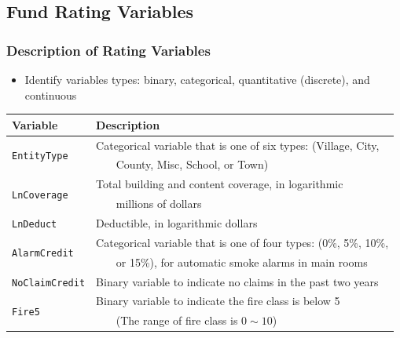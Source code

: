 \documentclass[serif,10pt]{beamer}
\begin{document}
\subsection{Fund Rating Variables}
\begin{frame}
\frametitle{Description of Rating Variables}
  \begin{itemize}
\item Identify variables types: binary, categorical, quantitative (discrete), and
continuous \vspace{2mm}
\end{itemize}
\begin{table}[htp]
\begin{center}
\begin{tabular}{ l | l}
\hline
Variable    & Description \\
\hline
\multirow{2}{*}{{\tt EntityType}}   & Categorical variable that is one of six types:  (Village, City, \\
& ~~~ County, Misc, School, or Town) \\
\multirow{2}{*}{\tt LnCoverage} & Total building and content coverage, in logarithmic \\
 & ~~~ millions of dollars \\
\multirow{2}{*}{{\tt LnDeduct}}     & \multirow{2}{*}{Deductible, in logarithmic dollars} \\
\\
 \multirow{2}{*}{{\tt AlarmCredit}}  & Categorical variable that is one of four types:  (0\%, 5\%, 10\%, \\
 & ~~~ or 15\%),   for automatic smoke alarms in main rooms \\
\multirow{2}{*}{{\tt NoClaimCredit}}    & \multirow{2}{*}{Binary variable to indicate no claims in the past two years} \\
\\
\multirow{2}{*}{{\tt Fire5}}            & Binary variable to indicate the fire class is below 5 \\
& ~~~ (The range of fire class is $0\sim10$)\\
\hline
\end{tabular}
\end{center}
\end{table}
\end{frame}
\end{document}
